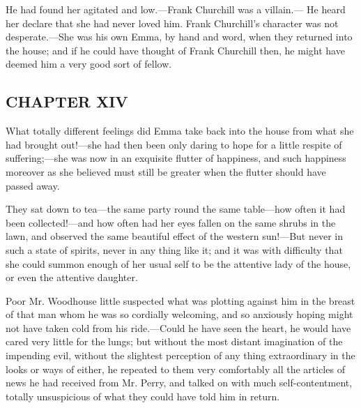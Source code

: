 He had found her agitated and low.---Frank Churchill was a villain.--- He heard her declare that she had never loved him. Frank Churchill's character was not desperate.---She was his own Emma, by hand and word, when they returned into the house; and if he could have thought of Frank Churchill then, he might have deemed him a very good sort of fellow.

\subsection[chapter-xiv-2]{\useURL[url52][][][]\from[url52]CHAPTER XIV}

What totally different feelings did Emma take back into the house from what she had brought out!---she had then been only daring to hope for a little respite of suffering;---she was now in an exquisite flutter of happiness, and such happiness moreover as she believed must still be greater when the flutter should have passed away.

They sat down to tea---the same party round the same table---how often it had been collected!---and how often had her eyes fallen on the same shrubs in the lawn, and observed the same beautiful effect of the western sun!---But never in such a state of spirits, never in any thing like it; and it was with difficulty that she could summon enough of her usual self to be the attentive lady of the house, or even the attentive daughter.

Poor Mr. Woodhouse little suspected what was plotting against him in the breast of that man whom he was so cordially welcoming, and so anxiously hoping might not have taken cold from his ride.---Could he have seen the heart, he would have cared very little for the lungs; but without the most distant imagination of the impending evil, without the slightest perception of any thing extraordinary in the looks or ways of either, he repeated to them very comfortably all the articles of news he had received from Mr. Perry, and talked on with much self-contentment, totally unsuspicious of what they could have told him in return.

